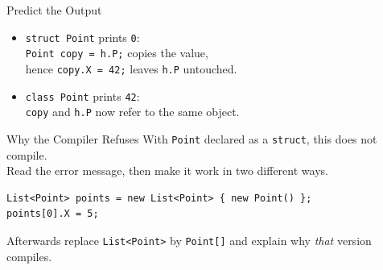 \begin{solutionframe}{Predict the Output}
  \begin{itemize}
    \item \texttt{struct Point} prints \texttt{0}:\\
       \texttt{Point copy = h.P;} copies the value,\\
       hence \texttt{copy.X = 42;} leaves \texttt{h.P}
       untouched.
    \item \texttt{class Point} prints \texttt{42}:\\
     \texttt{copy} and \texttt{h.P} now refer to the same object.
  \end{itemize}
  \vspace{3ex}

\end{solutionframe}

\begin{exerciseframe}{Why the Compiler Refuses}
  With \texttt{Point} declared as a \texttt{struct}, this does not compile.\\
  Read the error message, then make it work in two different ways.
  \vspace{1ex}

  \begin{lstlisting}[basicstyle=\scriptsize\ttfamily]
List<Point> points = new List<Point> { new Point() };
points[0].X = 5;
  \end{lstlisting}
  \vspace{1ex}

  Afterwards replace \texttt{List<Point>} by \texttt{Point[]} and explain why
  \emph{that} version compiles.
\end{exerciseframe}

